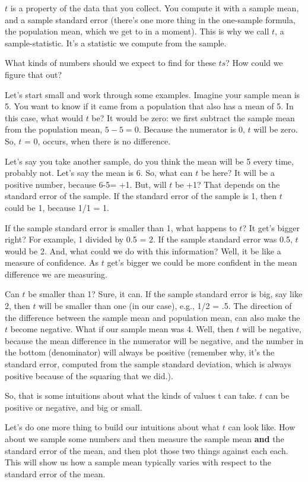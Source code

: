 \documentclass[
  letterpaper,
  DIV=11,
  numbers=noendperiod]{scrreprt}
\begin{document}
\(t\) is a property of the data that you collect. You compute it with a
sample mean, and a sample standard error (there's one more thing in the
one-sample formula, the population mean, which we get to in a moment).
This is why we call \(t\), a sample-statistic. It's a statistic we
compute from the sample.

What kinds of numbers should we expect to find for these \(ts\)? How
could we figure that out?

Let's start small and work through some examples. Imagine your sample
mean is 5. You want to know if it came from a population that also has a
mean of 5. In this case, what would \(t\) be? It would be zero: we first
subtract the sample mean from the population mean, \(5-5=0\). Because
the numerator is 0, \(t\) will be zero. So, \(t\) = 0, occurs, when
there is no difference.

Let's say you take another sample, do you think the mean will be 5 every
time, probably not. Let's say the mean is 6. So, what can \(t\) be here?
It will be a positive number, because 6-5= +1. But, will \(t\) be +1?
That depends on the standard error of the sample. If the standard error
of the sample is 1, then \(t\) could be 1, because 1/1 = 1.

If the sample standard error is smaller than 1, what happens to \(t\)?
It get's bigger right? For example, 1 divided by 0.5 = 2. If the sample
standard error was 0.5, \(t\) would be 2. And, what could we do with
this information? Well, it be like a measure of confidence. As \(t\)
get's bigger we could be more confident in the mean difference we are
measuring.

Can \(t\) be smaller than 1? Sure, it can. If the sample standard error
is big, say like 2, then \(t\) will be smaller than one (in our case),
e.g., 1/2 = .5. The direction of the difference between the sample mean
and population mean, can also make the \(t\) become negative. What if
our sample mean was 4. Well, then \(t\) will be negative, because the
mean difference in the numerator will be negative, and the number in the
bottom (denominator) will always be positive (remember why, it's the
standard error, computed from the sample standard deviation, which is
always positive because of the squaring that we did.).

So, that is some intuitions about what the kinds of values t can take.
\(t\) can be positive or negative, and big or small.

Let's do one more thing to build our intuitions about what \(t\) can
look like. How about we sample some numbers and then measure the sample
mean \textbf{and} the standard error of the mean, and then plot those
two things against each each. This will show us how a sample mean
typically varies with respect to the standard error of the mean.
\end{document}
